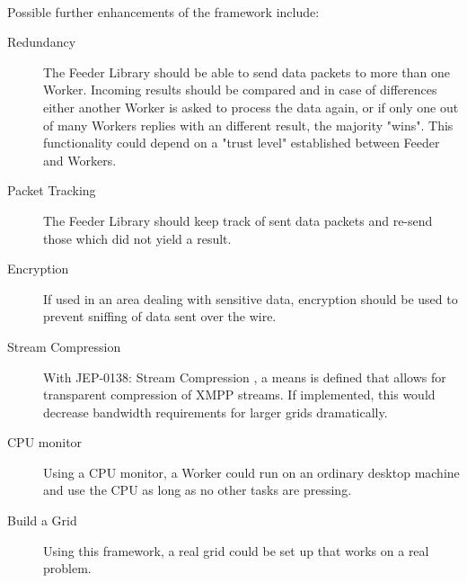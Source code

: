 \paragraph{}
Possible further enhancements of the framework include:
\begin{description}
\item[Redundancy] The Feeder Library should be able to send data packets to more than one Worker. Incoming results should be compared and in case of differences either another Worker is asked to process the data again, or if only one out of many Workers replies with an different result, the majority "wins". This functionality could depend on a "trust level" established between Feeder and Workers.
\item[Packet Tracking] The Feeder Library should keep track of sent data packets and re-send those which did not yield a result.
\item[Encryption] If used in an area dealing with sensitive data, encryption should be used to prevent sniffing of data sent over the wire.
\item[Stream Compression] With JEP-0138: Stream Compression \cite{jep0138}, a means is defined that allows for transparent compression of XMPP streams. If implemented, this would decrease bandwidth requirements for larger grids dramatically.
\item[CPU monitor] Using a CPU monitor, a Worker could run on an ordinary desktop machine and use the CPU as long as no other tasks are pressing.
\item[Build a Grid] Using this framework, a real grid could be set up that works on a real problem.
\end{description}
